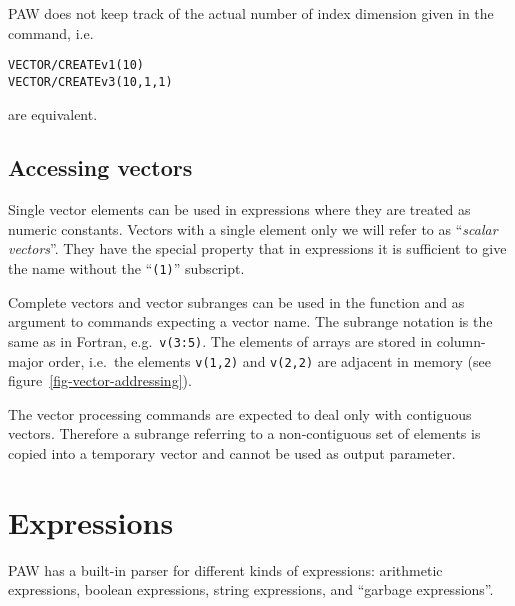 PAW does not keep track of the actual number of index dimension given in
the  command, i.e.\
\begin{alltt}
VECTOR/CREATE v1(10)
VECTOR/CREATE v3(10,1,1)
\end{alltt}
are equivalent.


\subsection{Accessing vectors}

Single vector elements can be used in expressions where they are treated as 
numeric constants. Vectors with a single element only we will refer to as 
``\emph{scalar vectors}''. They have the special property that in expressions 
it is sufficient to give the name without the ``\texttt{(1)}'' subscript.

Complete vectors and vector subranges can be used in the  
function and as argument to commands expecting a vector name. The subrange 
notation is the same as in Fortran, e.g.\ \texttt{v(3:5)}. The elements of 
arrays are stored in column-major order, i.e.\ the elements \texttt{v(1,2)} 
and \texttt{v(2,2)} are adjacent in memory (see 
figure~\ref{fig-vector-addressing}).

The vector processing commands are expected to deal only with contiguous 
vectors. Therefore a subrange referring to a non-contiguous set of elements is
copied into a temporary vector and cannot be used as output parameter.


\section{Expressions\label{sec-expressions}}

PAW has a built-in parser for different kinds of expressions:
arithmetic expressions, boolean expressions, string expressions, and
``garbage expressions''.


